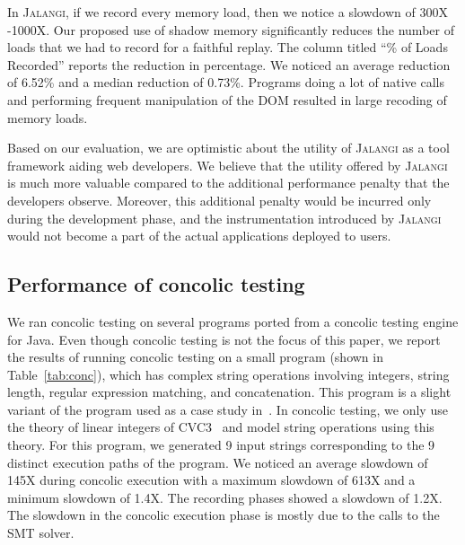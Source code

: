 \documentclass{sig-alternate}
\def\jalangi{\textsc{Jalangi}}
\begin{document}
In \jalangi{}, if we record every memory load, then we notice a
slowdown of 300X -1000X.  Our proposed use of shadow memory
significantly reduces the number of loads that we had to record for a
faithful replay.  The column titled ``\% of Loads Recorded'' reports
the reduction in percentage.  We noticed an average reduction of
6.52\% and a median reduction of 0.73\%.  Programs doing a lot of
native calls and performing frequent manipulation of the DOM resulted
in large recoding of memory loads.


Based on our evaluation, we are optimistic about the utility of
\jalangi{} as a tool framework aiding web developers.  We believe that
the utility offered by \jalangi{} is much more valuable compared to
the additional performance penalty that the developers
observe. Moreover, this additional penalty would be incurred only
during the development phase, and the instrumentation introduced by
\jalangi{} would not become a part of the actual applications deployed
to users.

\subsection{Performance of concolic testing}
\label{sec:conc-test-small}

We ran concolic testing on several programs ported from a concolic
testing engine for Java.  Even though concolic testing is not the focus of
this paper, we report the results of running concolic testing on a
small program (shown in Table~\ref{tab:conc}), which has complex
string operations involving integers, string length, regular
expression matching, and concatenation.  This program is a slight
variant of the program used as a case study
in~\cite{Bjorner:2009:PFA:1532891.1532927}.  In concolic testing, we
only use the theory of linear integers of CVC3~\cite{BT07} and model
string operations using this theory.  For this program, we generated 9
input strings corresponding to the 9 distinct execution paths of the
program.  We noticed an average slowdown of 145X during concolic
execution with a maximum slowdown of 613X and a minimum slowdown of
1.4X.  The recording phases showed a slowdown of 1.2X.  The slowdown
in the concolic execution phase is mostly due to the calls to the SMT
solver.
\end{document}

